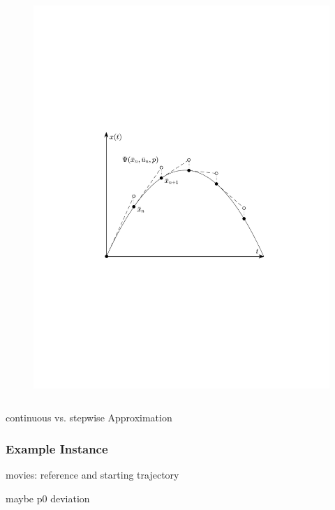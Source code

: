 \begin{frame}
\begin{columns}[t]
\begin{figure}
                \includegraphics[trim=3cm 7cm 3cm 9cm, clip=true, width=\linewidth]{img/stepExplEulerPlot}
            \end{figure}
    \end{columns}
    \begin{center}
        continuous vs. stepwise Approximation
    \end{center}
\end{frame}

\begin{frame}
    \frametitle{Example Instance}

    movies: reference and starting trajectory

    maybe p0 deviation
\end{frame}

